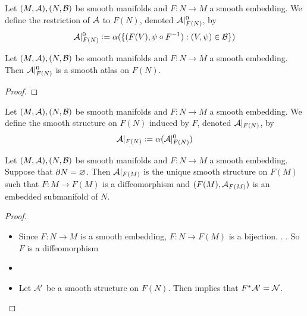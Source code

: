 \documentclass{book}
\begin{document}
	\begin{defn}
		Let $(M, \mathcal{A}), (N, \mathcal{B})$ be smooth manifolds and $F: N \rightarrow M$ a smooth embedding. We define the restriction of $\mathcal{A}$ to $F(N)$, denoted $\mathcal{A}|^0_{F(N)}$, by 
		$$\mathcal{A}|^0_{F(N)} \vcentcolon= \alpha (\{(F(V), \psi \circ F^{-1} ): (V, \psi) \in \mathcal{B}\})$$
	\end{defn}

	\begin{ex}
		Let $(M, \mathcal{A}), (N, \mathcal{B})$ be smooth manifolds and $F: N \rightarrow M$ a smooth embedding. Then $\mathcal{A}|^0_{F(N)}$ is a smooth atlas on $F(N)$.
	\end{ex}

	\begin{proof}
		
	\end{proof}

	\begin{defn}
		Let $(M, \mathcal{A}), (N, \mathcal{B})$ be smooth manifolds and $F: N \rightarrow M$ a smooth embedding. We define the smooth structure on $F(N)$ induced by $F$, denoted $\mathcal{A}|_{F(N)}$, by 
		$$\mathcal{A}|_{F(N)} \vcentcolon= \alpha (\mathcal{A}|_{F(N)}^0)$$
	\end{defn}

	\begin{ex}
		Let $(M, \mathcal{A}), (N, \mathcal{B})$ be smooth manifolds and $F: N \rightarrow M$ a smooth embedding. Suppose that $\partial N = \varnothing$. Then $\mathcal{A}|_{F(M)}$ is the unique smooth structure on $F(M)$ such that $F:M \rightarrow F(M)$ is a diffeomorphism and $(F(M), \mathcal{A}_{F(M)})$ is an embedded submanifold of $N$.
	\end{ex}

	\begin{proof}\
		\begin{itemize}
			\item Since $F:N \rightarrow M$ is a smooth embedding, $F:N \rightarrow F(M)$ is a bijection. . . So $F$ is a diffeomorphism 
			\item \tcr{Show $\iota:F(N) \rightarrow M$ is smooth embedding}
			\item Let $\mathcal{A}'$ be a smooth structure on $F(N)$. Then  implies that $F^*\mathcal{A}' = \mathcal{N}$. 
		\end{itemize}
	
		
	\end{proof}
\end{document}
